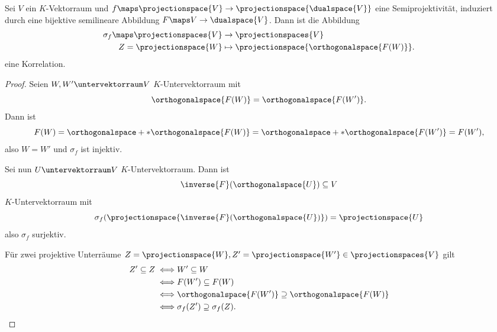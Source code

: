 \begin{lemma}
  Sei \( V \) ein \( K \)-Vektorraum und \( f\maps \projectionspace{V}\to \projectionspace{\dualspace{V}} \) eine Semiprojektivität, induziert durch eine bijektive semilineare Abbildung \( F\maps V\to \dualspace{V} \). Dann ist die Abbildung
  \begin{equation*}
    \begin{split}
      \sigma_f\maps \projectionspaces{V}&\to\projectionspaces{V}\\
      Z=\projectionspace{W}&\mapsto \projectionspace{\orthogonalspace{F(W)}}.
    \end{split}
  \end{equation*}
  eine Korrelation.
\end{lemma}
\begin{proof}
  Seien \( W, W'\untervektorraum V \) \( K \)-Untervektorraum mit 
  \begin{equation*}
    \orthogonalspace{F(W)}=\orthogonalspace{F(W')}.
  \end{equation*}
  Dann ist
  \begin{equation*}
    F(W)=\orthogonalspace+*{\orthogonalspace{F(W)}}=\orthogonalspace+*{\orthogonalspace{F(W')}}=F(W'),
  \end{equation*}
  also \( W=W' \) und \( \sigma_f \) ist injektiv.

  Sei nun \( U\untervektorraum V \) \( K \)-Untervektorraum. Dann ist
  \begin{equation}
    \inverse{F}(\orthogonalspace{U})\subseteq V
  \end{equation}
  \( K \)-Untervektorraum mit
  \begin{equation*}
    \sigma_f(\projectionspace{\inverse{F}(\orthogonalspace{U})})=\projectionspace{U}
  \end{equation*}
  also \( \sigma_f \) surjektiv.

  Für zwei projektive Unterräume \( Z=\projectionspace{W} , Z'=\projectionspace{W'} \in \projectionspaces{V}  \) gilt
  \begin{align*}
    Z'\subseteq Z\iff &W'\subseteq W\\
    \iff &F(W')\subseteq F(W)\\
    \iff &\orthogonalspace{F(W')}\supseteq \orthogonalspace{F(W)}\\
    \iff &\sigma_f(Z')\supseteq \sigma_f(Z).
  \end{align*}
\end{proof}

